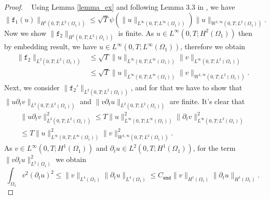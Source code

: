 \documentclass[11pt]{article}
\begin{document}
\begin{proof}~
Using Lemma \ref{lemma_ex} and following Lemma 3.3 in \cite{caetano2010schwarz}, we have 
\begin{equation}\label{fh1}
\parallel\mathtt{f}_1(u)\parallel_{ H^1(0,T; L^2(\Omega_1))} \leq \sqrt{T} \psi \left( \parallel u\parallel_{L^{\infty}(0, T; L^{\infty}(\Omega_1))} \right) \parallel u\parallel_{W^{1, \infty}(0, T; L^{2}(\Omega_1))}. 
\end{equation}
 Now we show $\parallel\mathtt{f}_2\parallel_{ H^1(0,T; L^2(\Omega_1))}$ is finite. As $u\in L^{\infty}(0,T; H^2(\Omega_1))$ then by embedding result, we have $u\in L^{\infty}(0,T; L^{\infty}(\Omega_1))$, therefore we obtain 
\begin{equation}\label{fh2}
\begin{aligned}
\parallel\mathtt{f}_2\parallel_{ L^2(0,T; L^2(\Omega_1))} &\leq \sqrt{T} \parallel u\parallel_{L^{\infty}(0,T; L^{\infty}(\Omega_1))}  \parallel v\parallel_{L^{\infty}(0,T; L^{2}(\Omega_1))} \\
&\leq \sqrt{T} \parallel u\parallel_{L^{\infty}(0,T; L^{\infty}(\Omega_1))}  \parallel v\parallel_{W^{1,\infty}(0,T; L^{2}(\Omega_1))}. 
\end{aligned}
\end{equation}
Next, we consider $\parallel\mathtt{f}_2'\parallel_{ L^2(0,T; L^2(\Omega_1))}$, and for that we have to show that $\parallel u \partial_t v\parallel_{ L^2(0,T; L^2(\Omega_1))}$ and $\parallel v\partial_t u\parallel_{ L^2(0,T; L^2(\Omega_1))}$ are finite. It's clear that  
\begin{equation}\label{fh3}
\begin{aligned}
\parallel u \partial_t v\parallel_{ L^2(0,T; L^2(\Omega_1))}^2  \leq T\parallel u \parallel_{ L^{\infty}(0,T; L^{\infty}(\Omega_1))}^2
\parallel \partial_t v\parallel_{ L^{\infty}(0,T; L^{2}(\Omega_1))}^2 \\ \leq T\parallel u \parallel_{ L^{\infty}(0,T; L^{\infty}(\Omega_1))}^2
\parallel v\parallel_{ W^{1,\infty}(0,T; L^2(\Omega_1))}^2. 
\end{aligned}
\end{equation}
As $v\in L^{\infty}(0,T; H^1(\Omega_1))$ and $\partial_t u\in L^{2}(0,T; H^{1}(\Omega_1))$, for the term $\parallel v \partial_t u \parallel^2_{L^2(\Omega_1)}$ we obtain 
\begin{equation*}
\int_{\Omega_1} v^2 (\partial_t u)^2 \leq \parallel v\parallel_{L^{4}(\Omega_1)}  \parallel \partial_t u\parallel_{L^4(\Omega_1)} \leq C_{\texttt{emd}} \parallel v\parallel_{H^{1}(\Omega_1)}  \parallel \partial_t u\parallel_{H^1(\Omega_1)}.

\end{equation*}
\end{proof}
\end{document}
